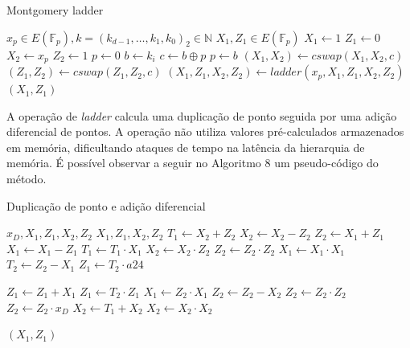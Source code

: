 \begin{algorithm}[H]
\caption{Montgomery ladder}
\begin{algorithmic} 
    \REQUIRE $x_p \in E(\mathbb{F}_p), k=(k_{d-1},\ldots,k_1,k_0)_2 \in \mathbb{N}$
    \ENSURE $X_1, Z_1 \in E(\mathbb{F}_p)$
    \STATE $X_1 \leftarrow 1$
    \STATE $Z_1 \leftarrow 0$
    \STATE $X_2 \leftarrow x_p$
    \STATE $Z_2 \leftarrow 1$
    \STATE $p \leftarrow 0$
        \STATE $b \leftarrow k_i$
        \STATE $c \leftarrow b \oplus p$
        \STATE $p \leftarrow b$
        \STATE $(X_1, X_2) \leftarrow cswap(X_1,X_2,c)$
        \STATE $(Z_1,Z_2) \leftarrow cswap(Z_1,Z_2,c)$
        \STATE $(X_1, Z_1, X_2, Z_2) \leftarrow ladder(x_p, X_1, Z_1, X_2, Z_2)$
    \ENDFOR
    \RETURN $(X_1,Z_1)$
    \end{algorithmic}
\end{algorithm}

A operação de \emph{ladder} calcula uma duplicação de ponto seguida por uma adição diferencial de pontos. A operação não utiliza valores pré-calculados armazenados em memória,
dificultando ataques de tempo na latência da hierarquia de memória. É possível observar a seguir no Algoritmo 8 um pseudo-código do método.

\begin{algorithm}[H]
\caption{Duplicação de ponto e adição diferencial}
\begin{multicols}{2}
\begin{algorithmic} 
    \REQUIRE $x_D, X_1, Z_1, X_2, Z_2$
    \ENSURE $X_1, Z_1, X_2, Z_2$
    \STATE $T_1 \leftarrow X_2 + Z_2$
    \STATE $X_2 \leftarrow X_2 - Z_2$
    \STATE $Z_2 \leftarrow X_1 + Z_1$
    \STATE $X_1 \leftarrow X_1 - Z_1$
    \STATE $T_1 \leftarrow T_1 \cdot X_1$
    \STATE $X_2 \leftarrow X_2 \cdot Z_2$
    \STATE $Z_2 \leftarrow Z_2 \cdot Z_2$
    \STATE $X_1 \leftarrow X_1 \cdot X_1$
    \STATE $T_2 \leftarrow Z_2 - X_1$
    \STATE $Z_1 \leftarrow T_2 \cdot a24$
    
    
    \STATE $Z_1 \leftarrow Z_1 + X_1$
    \STATE $Z_1 \leftarrow T_2 \cdot Z_1$
    \STATE $X_1 \leftarrow Z_2 \cdot X_1$
    \STATE $Z_2 \leftarrow Z_2 - X_2$
    \STATE $Z_2 \leftarrow Z_2 \cdot Z_2$
    \STATE $Z_2 \leftarrow Z_2 \cdot x_D$
    \STATE $X_2 \leftarrow T_1 + X_2$
    \STATE $X_2 \leftarrow X_2 \cdot X_2$
    
    \RETURN $(X_1,Z_1)$
\end{algorithmic}
\end{multicols}
\end{algorithm}


